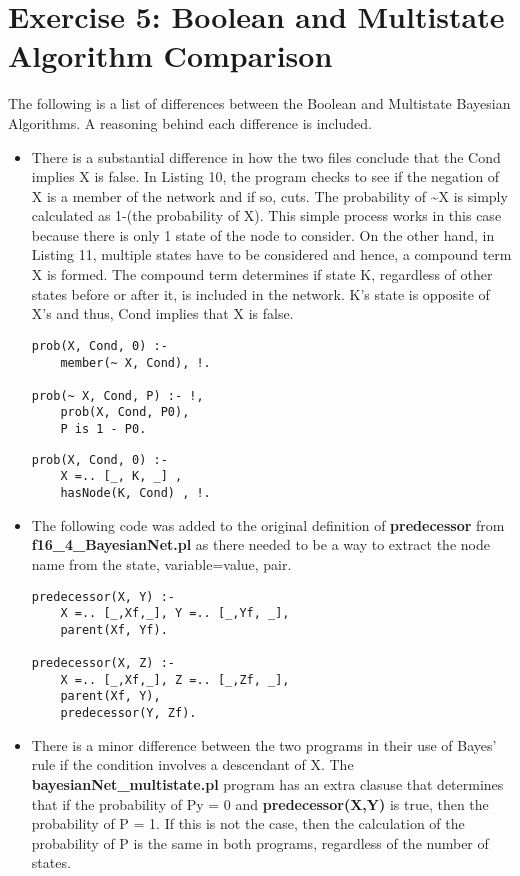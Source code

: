 \documentclass[11pt]{article}
\begin{document}
\section{Exercise 5: Boolean and Multistate Algorithm Comparison}
The following is a list of differences between the Boolean and Multistate Bayesian Algorithms. A reasoning behind each difference is included.
\begin{itemize}
\item There is a substantial difference in how the two files conclude that the Cond implies X is false. In Listing 10, the program checks to see if the negation of X is a member of the network and if so, cuts. The probability of \textasciitilde X is simply calculated as 1-(the probability of X). This simple process works in this case because there is only 1 state of the node to consider. On the other hand, in Listing 11, multiple states have to be considered and hence, a compound term X is formed. The compound term determines if state K, regardless of other states before or after it, is included in the network. K's state is opposite of X's and thus, Cond implies that X is false. 
\begin{lstlisting}
prob(X, Cond, 0) :-              
    member(~ X, Cond), !.

prob(~ X, Cond, P) :- !,        
    prob(X, Cond, P0),
    P is 1 - P0.
\end{lstlisting}

\begin{lstlisting}
prob(X, Cond, 0) :-            
    X =.. [_, K, _] ,
    hasNode(K, Cond) , !.
\end{lstlisting}
\item The following code was added to the original definition of \textbf{predecessor} from  \textbf{f16\_4\_BayesianNet.pl} as there needed to be a way to extract the node name from
the state, variable=value, pair.
\begin{lstlisting}
predecessor(X, Y) :-
    X =.. [_,Xf,_], Y =.. [_,Yf, _],
    parent(Xf, Yf).

predecessor(X, Z) :-
    X =.. [_,Xf,_], Z =.. [_,Zf, _],
    parent(Xf, Y),
    predecessor(Y, Zf).
\end{lstlisting}
\item There is a minor difference between the two programs in their use of Bayes' rule if the condition involves a descendant of X. The \textbf{bayesianNet\_multistate.pl} program has an extra clasuse that determines that if the probability of Py = 0 and \textbf{predecessor(X,Y)} is true, then the probability of P = 1. If this is not the case, then the calculation of the probability of P is the same in both programs, regardless of the number of states.


\end{itemize}
\end{document}

